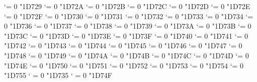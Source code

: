 {  \Umathcode `\Ξ = 0 \normalfam "1D729 
  \Umathcode `\Ο = 0 \normalfam "1D72A 
  \Umathcode `\Π = 0 \normalfam "1D72B 
  \Umathcode `\Ρ = 0 \normalfam "1D72C 
  \Umathcode `\ϴ = 0 \normalfam "1D72D 
  \Umathcode `\Σ = 0 \normalfam "1D72E 
  \Umathcode `\Τ = 0 \normalfam "1D72F 
  \Umathcode `\Υ = 0 \normalfam "1D730 
  \Umathcode `\Φ = 0 \normalfam "1D731 
  \Umathcode `\Χ = 0 \normalfam "1D732 
  \Umathcode `\Ψ = 0 \normalfam "1D733 
  \Umathcode `\Ω = 0 \normalfam "1D734 
  \Umathcode `\α = 0 \normalfam "1D736 
  \Umathcode `\β = 0 \normalfam "1D737 
  \Umathcode `\γ = 0 \normalfam "1D738 
  \Umathcode `\δ = 0 \normalfam "1D739 
  \Umathcode `\ε = 0 \normalfam "1D73A 
  \Umathcode `\ζ = 0 \normalfam "1D73B 
  \Umathcode `\η = 0 \normalfam "1D73C 
  \Umathcode `\θ = 0 \normalfam "1D73D 
  \Umathcode `\ι = 0 \normalfam "1D73E 
  \Umathcode `\κ = 0 \normalfam "1D73F 
  \Umathcode `\λ = 0 \normalfam "1D740 
  \Umathcode `\μ = 0 \normalfam "1D741 
  \Umathcode `\ν = 0 \normalfam "1D742 
  \Umathcode `\ξ = 0 \normalfam "1D743 
  \Umathcode `\ο = 0 \normalfam "1D744 
  \Umathcode `\π = 0 \normalfam "1D745 
  \Umathcode `\ρ = 0 \normalfam "1D746 
  \Umathcode `\ς = 0 \normalfam "1D747 
  \Umathcode `\σ = 0 \normalfam "1D748 
  \Umathcode `\τ = 0 \normalfam "1D749 
  \Umathcode `\υ = 0 \normalfam "1D74A 
  \Umathcode `\φ = 0 \normalfam "1D74B 
  \Umathcode `\χ = 0 \normalfam "1D74C 
  \Umathcode `\ψ = 0 \normalfam "1D74D 
  \Umathcode `\ω = 0 \normalfam "1D74E 
  \Umathcode `\ϵ = 0 \normalfam "1D750 
  \Umathcode `\ϑ = 0 \normalfam "1D751 
  \Umathcode `\ϰ = 0 \normalfam "1D752 
  \Umathcode `\ϕ = 0 \normalfam "1D753 
  \Umathcode `\ϱ = 0 \normalfam "1D754 
  \Umathcode `\ϖ = 0 \normalfam "1D755 
  \Umathcode `\∇ = 0 \normalfam "1D735 
  \Umathcode `\∂ = 0 \normalfam "1D74F 
\tenbfit}%
